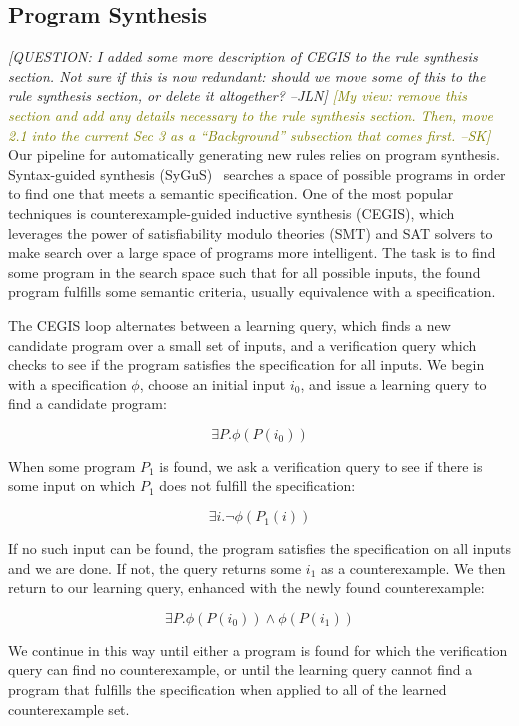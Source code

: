 \documentclass[acmsmall,review]{acmart}\settopmatter{printfolios=true,printccs=false,printacmref=false}
\newcommand{\jln}[1]{\textcolor{uwpurple}{\textit{[{#1} --JLN]}}}
\newcommand{\sak}[1]{\textcolor{olive}{\textit{[{#1} --SK]}}}
\begin{document}
\subsection{Program Synthesis}
\label{sec:program-synthesis}
\jln{QUESTION: I added some more description of CEGIS to the rule synthesis section. 
Not sure if this is now redundant: should we move some of this to the rule synthesis
section, or delete it altogether?}
\sak{My view: remove this section and add any details necessary to the rule synthesis section.
  Then, move 2.1 into the current Sec 3 as a ``Background'' subsection that comes first.}
Our pipeline for automatically generating new rules relies on program synthesis.
Syntax-guided synthesis (SyGuS)~\cite{sygus} searches a space of possible programs in order to find one that meets
a semantic specification.  One of the most popular techniques is counterexample-guided
inductive synthesis (CEGIS), which leverages the power of satisfiability modulo theories
(SMT) and SAT solvers to make search over a large space of programs more intelligent.
The task is to find some program in the search space such that for all possible
inputs, the found program fulfills some semantic criteria, usually equivalence with
a specification.

The CEGIS loop alternates between a learning query, which finds a new candidate program over a small set of inputs, and a verification query which checks to see if the program satisfies the specification for all inputs. We begin with a specification $\phi$, choose an initial input $i_0$, and issue a learning query to find a candidate program:

$$\exists P . \phi(P(i_0))$$

When some program $P_1$ is found, we ask a verification query to see if there is some input on which $P_1$ does not fulfill the specification:

$$\exists i . \neg \phi(P_1(i))$$

If no such input can be found, the program satisfies the specification on all inputs and we are done. If not, the query returns some $i_1$ as a counterexample. We then return to our learning query, enhanced with the newly found counterexample:

$$\exists P . \phi(P(i_0)) \wedge \phi(P(i_1))$$

We continue in this way until either a program is found for which the verification query can find no counterexample, or until the learning query cannot find a program that fulfills the specification when applied to all of the learned counterexample set.
\end{document}
